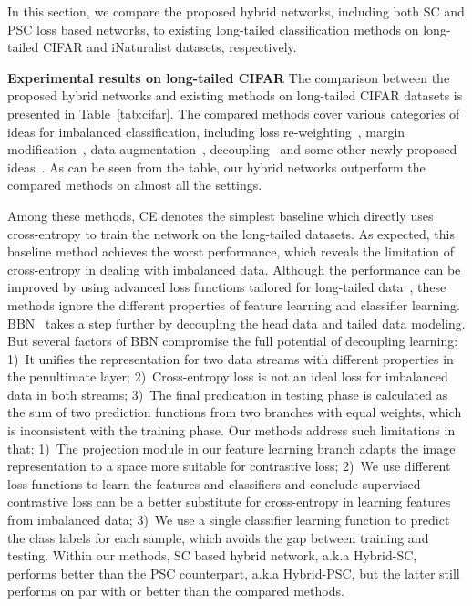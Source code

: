 \documentclass[final]{cvpr}
\begin{document}
In this section, we compare the proposed hybrid networks, including both SC and PSC loss based networks, to existing long-tailed classification methods on long-tailed CIFAR and iNaturalist datasets, respectively. 
\par{\textbf{Experimental results on long-tailed CIFAR}} The comparison between the proposed hybrid networks and existing methods on long-tailed CIFAR datasets is presented in Table~\ref{tab:cifar}. The compared methods cover various categories of ideas for imbalanced classification, including loss re-weighting~\cite{effnumber}, margin modification~\cite{cao2019learning}, data augmentation~\cite{m2m}, decoupling~\cite{BBN} and some other newly proposed ideas~\cite{casual,CB-DA}. As can be seen from the table, our hybrid networks outperform the compared methods on almost all the settings. 

Among these methods, CE denotes the simplest baseline which directly uses cross-entropy to train the network on the long-tailed datasets. As expected, this baseline method achieves the worst performance, which reveals the limitation of cross-entropy in dealing with imbalanced data. Although the performance can be improved by using advanced loss functions tailored for long-tailed data~\cite{cao2019learning, effnumber, focal}, these methods ignore the different properties of feature learning and classifier learning. BBN~\cite{BBN} takes a step further by decoupling the head data and tailed data modeling. But several factors of BBN compromise the full potential of decoupling learning: 1)~It unifies the representation for two data streams with different properties in the penultimate layer; 2)~Cross-entropy loss is not an ideal loss for imbalanced data in both streams; 3)~The final predication in testing phase is calculated as the sum of two prediction functions from two branches with equal weights, which is inconsistent with the training phase. Our methods address such limitations in that: 1)~The projection module in our feature learning branch adapts the image representation to a space more suitable for contrastive loss; 2)~We use different loss functions to learn the features and classifiers and conclude supervised contrastive loss can be a better substitute for cross-entropy in learning features from imbalanced data; 3)~We use a single classifier learning function to predict the class labels for each sample, which avoids the gap between training and testing.  Within our methods, SC based hybrid network, a.k.a Hybrid-SC, performs better than the PSC counterpart, a.k.a Hybrid-PSC, but the latter still performs on par with or better than the compared methods.  
\end{document}
